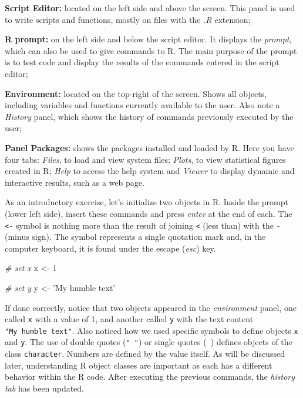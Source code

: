 \documentclass[
  12pt,
]{book}
\newenvironment{Shaded}{\begin{snugshade}}{\end{snugshade}}
\newcommand{\CommentTok}[1]{\textcolor[rgb]{0.37,0.37,0.37}{\textit{#1}}}
\newcommand{\DecValTok}[1]{\textcolor[rgb]{0.06,0.06,0.06}{#1}}
\newcommand{\NormalTok}[1]{#1}
\newcommand{\StringTok}[1]{\textcolor[rgb]{0.5,0.5,0.5}{#1}}
\begin{document}
\textbf{Script Editor:} located on the left side and above the screen. This panel is used to write scripts and functions, mostly on files with the \emph{.R} extension; 

\textbf{R prompt:} on the left side and below the script editor. It displays the \emph{prompt}, which can also be used to give commands to R. The main purpose of the prompt is to test code and display the results of the commands entered in the script editor; 

\textbf{Environment:} located on the top-right of the screen. Shows all objects, including variables and functions currently available to the user. Also note a \emph{History} panel, which shows the history of commands previously executed by the user; 

\textbf{Panel Packages:} shows the packages installed and loaded by R. Here you have four tabs: \emph{Files}, to load and view system files; \emph{Plots}, to view statistical figures created in R; \emph{Help} to access the help system and \emph{Viewer} to display dynamic and interactive results, such as a web page. 

As an introductory exercise, let's initialize two objects in R. Inside the prompt (lower left side), insert these commands and press \emph{enter} at the end of each. The \texttt{\textless{}-} symbol is nothing more than the result of joining \texttt{\textless{}} (less than) with the \texttt{-} (minus sign). The \texttt{\textquotesingle{}} symbol represents a single quotation mark and, in the computer keyboard, it is found under the escape (\emph{esc}) key.

\begin{Shaded}
\begin{Highlighting}[]
\CommentTok{# set x}
\NormalTok{x <-}\StringTok{ }\DecValTok{1}

\CommentTok{# set y}
\NormalTok{y <-}\StringTok{ 'My humble text'}
\end{Highlighting}
\end{Shaded}

If done correctly, notice that two objects appeared in the \emph{environment} panel, one called \texttt{x} with a value of 1, and another called \texttt{y} with the text content \texttt{"My\ humble\ text"}. Also noticed how we used specific symbols to define objects \texttt{x} and \texttt{y}. The use of double quotes (\texttt{"\ "}) or single quotes (\texttt{\textquotesingle{}\ \textquotesingle{}}) defines objects of the class \texttt{character}. Numbers are defined by the value itself. As will be discussed later, understanding R object classes are important as each has a different behavior within the R code. After executing the previous commands, the \emph{history tab} has been updated.
\end{document}
